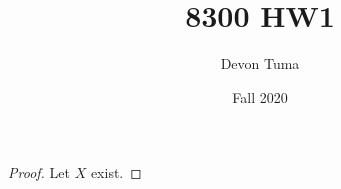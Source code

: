 \documentclass[11pt]{article}
\title{8300 HW1}
\author{Devon Tuma}
\date{Fall 2020}
\begin{document}
\maketitle

\begin{proof}
  Let $X$ exist.
\end{proof}
\end{document}
